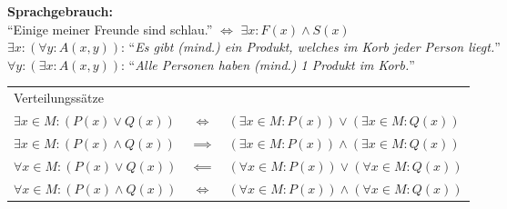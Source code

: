 \documentclass[8pt,landscape]{scrartcl}
\begin{document}
\begin{multicols}{3}
\textbf{Sprachgebrauch:}\\
``Einige meiner Freunde sind schlau.'' $\iff$ $\exists x : F(x) \land S(x) $\\
$\exists x : (\forall y : A(x, y))$: ``\textit{Es gibt (mind.) ein Produkt, welches im Korb jeder Person liegt.}''\\
$\forall y : (\exists x : A(x, y))$: ``\textit{Alle Personen haben (mind.) 1 Produkt im Korb.}''\\

\begin{tabular}{l c l}
Verteilungss\"atze & & \\
$\exists x \in M: (P(x) \lor Q(x))$ & $\iff$ & $(\exists x \in M : P(x)) \lor (\exists x \in M : Q(x))$\\
$\exists x \in M: (P(x) \land Q(x))$ & $\implies$ & $(\exists x \in M : P(x)) \land (\exists x \in M : Q(x))$\\
$\forall x \in M: (P(x) \lor Q(x))$ & $\impliedby$ & $(\forall x \in M : P(x)) \lor (\forall x \in M : Q(x))$\\
$\forall x \in M: (P(x) \land Q(x))$ & $\iff$ & $(\forall x \in M : P(x)) \land (\forall x \in M : Q(x))$\\
\end{tabular}




\end{multicols}
\end{document}
